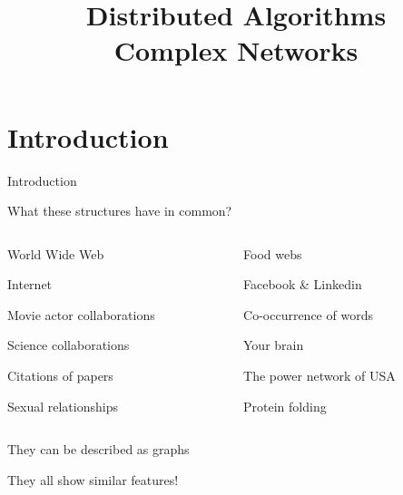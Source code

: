 
\title[DS - Complex Network]{\textbf{Distributed Algorithms}\\Complex Networks}

\graphicspath{{figs/08/}}



\newcommand{\Path}{\ell}
\newcommand{\Diam}{\mathit{diam}}


\FrameContent


\section{Introduction}

\begin{frame}{Introduction}

\begin{block}{What these structures have in common?}

\begin{columns}
\begin{column}{0.5\textwidth}
\BI
\item World Wide Web
\item Internet
\item Movie actor collaborations
\item Science collaborations
\item Citations of papers
\item Sexual relationships
\EI
\end{column}
\begin{column}{0.5\textwidth}
\BI
\item Food webs
\item Facebook \& Linkedin
\item Co-occurrence of words
\item Your brain
\item The power network of USA
\item Protein folding
\EI
\end{column}
\end{columns}
\end{block}

\pause
\bigskip
\BI
\item They can be described as graphs
\pause
\item They all show similar features!
\EI

\end{frame}



